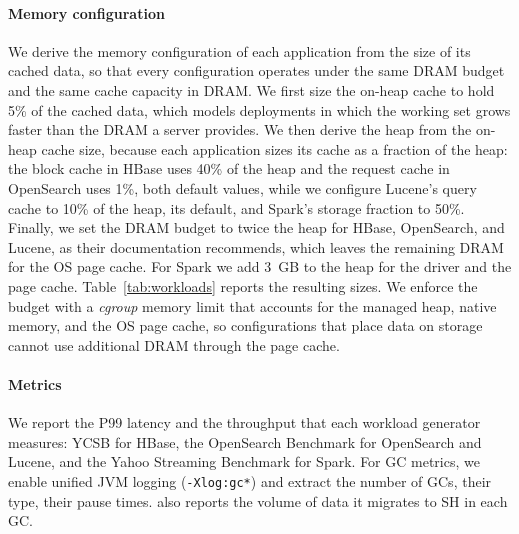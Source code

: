 \paragraph{\textbf{Memory configuration}}
We derive the memory configuration of each application from the size of its cached data, so that every configuration operates under the same DRAM budget and the same cache capacity in DRAM.
We first size the on-heap cache to hold 5\% of the cached data, which models deployments in which the working set grows faster than the DRAM a server provides.
We then derive the heap from the on-heap cache size, because each application sizes its cache as a fraction of the heap: the block cache in HBase uses 40\% of the heap and the request cache in OpenSearch uses 1\%, both default values, while we configure Lucene's query cache to 10\% of the heap, its default, and Spark's storage fraction to 50\%.
Finally, we set the DRAM budget to twice the heap for HBase, OpenSearch, and Lucene, as their documentation recommends, which leaves the remaining DRAM for the OS page cache.
For Spark we add \SI{3}{GB} to the heap for the driver and the page cache.
Table~\ref{tab:workloads} reports the resulting sizes.
We enforce the budget with a \emph{cgroup} memory limit that accounts for the managed heap, native memory, and the OS page cache, so configurations that place data on storage cannot use additional DRAM through the page cache.

\paragraph{\textbf{Metrics}}
We report the P99 latency and the throughput that each workload generator measures: YCSB for HBase, the OpenSearch Benchmark for OpenSearch and Lucene, and the Yahoo Streaming Benchmark for Spark.
For GC metrics, we enable unified JVM logging (\texttt{-Xlog:gc*}) and extract the number of GCs, their type, their pause times.
\chipperName{} also reports the volume of data it migrates to SH in each GC.

